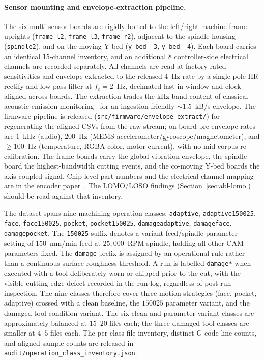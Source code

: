 \documentclass[sensors,article,submit,moreauthors,pdftex]{Definitions/mdpi}
\begin{document}
\paragraph{Sensor mounting and envelope-extraction pipeline.} The six multi-sensor boards are rigidly bolted to the left/right machine-frame uprights (\texttt{frame\_l2}, \texttt{frame\_l3}, \texttt{frame\_r2}), adjacent to the spindle housing (\texttt{spindle2}), and on the moving Y-bed (\texttt{y\_bed\_\_3}, \texttt{y\_bed\_\_4}). Each board carries an identical $15$-channel inventory, and an additional 8 controller-side electrical channels are recorded separately. All channels are read at factory-rated sensitivities and envelope-extracted to the released 4~Hz rate by a single-pole IIR rectify-and-low-pass filter at $f_c\!=\!2$~Hz, decimated last-in-window and clock-aligned across boards. The extraction trades the kHz-band content of classical acoustic-emission monitoring~\cite{teti2010advanced} for an ingestion-friendly $\sim 1.5$~kB/s envelope. The firmware pipeline is released (\texttt{src/firmware/envelope\_extract/}) for regenerating the aligned CSVs from the raw stream; on-board pre-envelope rates are $1$~kHz (audio), $200$~Hz (MEMS accelerometer/gyroscope/magnetometer), and $\geq\!100$~Hz (temperature, RGBA color, motor current), with no mid-corpus re-calibration. The frame boards carry the global vibration envelope, the spindle board the highest-bandwidth cutting events, and the co-moving Y-bed boards the axis-coupled signal. Chip-level part numbers and the electrical-channel mapping are in the encoder paper~\cite{encoder_paper}. The LOMO/LOSO findings (Section~\ref{sec:abl-lomo}) should be read against that inventory.

The dataset spans nine machining operation classes: \texttt{adaptive}, \texttt{adaptive150025}, \texttt{face}, \texttt{face150025}, \texttt{pocket}, \texttt{pocket150025}, \texttt{damageadaptive}, \texttt{damageface}, \texttt{damagepocket}. The \texttt{150025} suffix denotes a variant feed/spindle parameter setting of $150$~mm/min feed at $25{,}000$~RPM spindle, holding all other CAM parameters fixed. The \texttt{damage} prefix is assigned by an operational rule rather than a continuous surface-roughness threshold. A run is labelled \texttt{damage*} when executed with a tool deliberately worn or chipped prior to the cut, with the visible cutting-edge defect recorded in the run log, regardless of post-run inspection. The nine classes therefore cover three motion strategies (face, pocket, adaptive) crossed with a clean baseline, the $150025$ parameter variant, and the damaged-tool condition variant. The six clean and parameter-variant classes are approximately balanced at $15$--$20$ files each; the three damaged-tool classes are smaller at $4$--$5$ files each. The per-class file inventory, distinct G-code-line counts, and aligned-sample counts are released in \texttt{audit/operation\_class\_inventory.json}.
\end{document}
